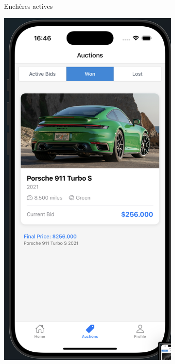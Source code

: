 \begin{figure}[H]
\begin{subfigure}[b]{0.32\textwidth}
        \caption{Enchères actives}
        \label{fig:active-bids}
    \end{subfigure}
    \hfill
    \begin{subfigure}[b]{0.32\textwidth}
        \includegraphics[width=\textwidth]{images/auction page with won bids.png}

\end{subfigure}
\end{figure}
